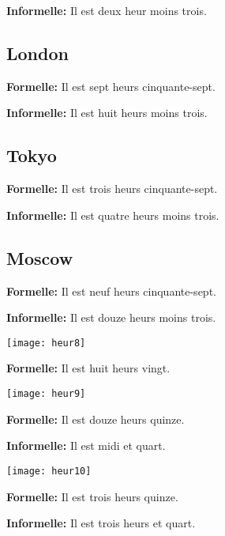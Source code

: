 \textbf{Informelle:} Il est deux heur moins trois.

\subsection*{London}

\textbf{Formelle:} Il est sept heurs cinquante-sept.

\textbf{Informelle:} Il est huit heurs moins trois.

\subsection*{Tokyo}

\textbf{Formelle:} Il est trois heurs cinquante-sept.

\textbf{Informelle:} Il est quatre heurs moins trois.

\subsection*{Moscow}

\textbf{Formelle:} Il est neuf heurs cinquante-sept.

\textbf{Informelle:} Il est douze heurs moins trois.

\begin{center}
    \texttt{[image: heur8]}
\end{center}

\textbf{Formelle:} Il est huit heurs vingt.

\begin{center}
    \texttt{[image: heur9]}
\end{center}

\textbf{Formelle:} Il est douze heurs quinze. 

\textbf{Informelle:} Il est midi et quart.

\begin{center}
    \texttt{[image: heur10]}
\end{center}

\textbf{Formelle:} Il est trois heurs quinze.


\textbf{Informelle:} Il est trois heurs et quart.